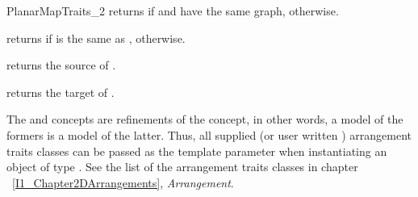 \begin{ccRefConcept}{PlanarMapTraits_2}
         {returns  if  and  have the same graph, 
            otherwise.}

         {returns  if  is the same as , 
           otherwise.}
	  

         {returns the source of .}

             {returns the target of .}


      

\ccHasModels

The  and
 concepts are refinements of the
 concept, in other words, a model of the
formers is a model of the latter.  Thus, all
supplied (or user written ) arrangement traits classes can be passed
as the  template parameter when instantiating an object of
type .  See the list of the arrangement
traits classes in chapter ~\ref{I1_Chapter2DArrangements},
{\em Arrangement}.
  
\end{ccRefConcept} %

\ccRefPageEnd
